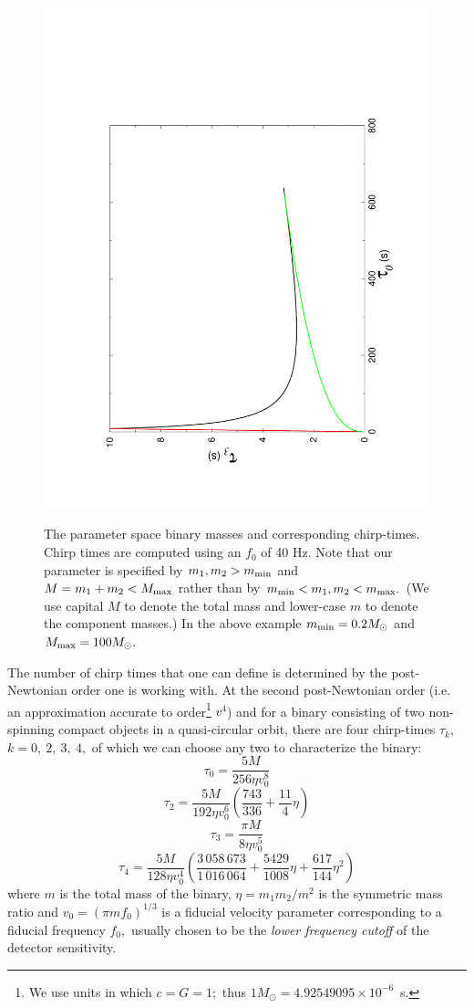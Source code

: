 \begin{figure}[h]
{\noindent\includegraphics[angle=-90,width=0.49\linewidth]{./LALInspiralBankHt0t3}
}
\caption{The parameter space binary masses and corresponding
chirp-times. Chirp times are computed using an $f_0$ of 40 Hz. Note
that our parameter is specified by $m_1, m_2 >m_{\rm min}$ and 
$M=m_1+m_2 < M_{\rm max}$ rather than by $m_{\rm min} < m_1,m_2 < m_{\rm max}.$
(We use capital $M$ to denote the total mass and lower-case $m$ to denote
the component masses.) In the above example $m_{\rm min} = 0.2 M_\odot$
and $M_{\rm max} = 100 M_\odot.$}
\label{fig:chirp-times}
\end{figure}

The number of chirp
times that one can define is determined by the post-Newtonian order
one is working with. At the second post-Newtonian order (i.e. 
an approximation accurate to order\footnote{We use units in 
which $c=G=1;$ thus $1M_\odot=4.92549095 \times 10^{-6}$~s.} $v^4$) and for
a binary consisting of two non-spinning compact objects in a quasi-circular
orbit, there are
four chirp-times $\tau_k,$ $k=0,\ 2,\ 3,\ 4,$ of which we can choose
any two to characterize the binary:
\begin{equation}
\tau_{0} = \frac{5M}{256 \eta v_{0}^{8}}
\end{equation}
\begin{equation}
\tau_{2} = \frac{5M}{192 \eta v_{0}^{6}} \left( \frac{743}{336} + \frac{11}{4} \eta \right)
\end{equation}
\begin{equation}
\tau_{3} = \frac{\pi M}{8 \eta v_{0}^{5}}
\end{equation}
\begin{equation}
\tau_{4} = \frac{5M}{128 \eta v_{0}^4} \left( \frac{3\,058\,673}{1\,016\,064} + \frac{5429}{1008}
\eta +
\frac{617}{144} \eta^{2} \right)
\end{equation}
where $m$ is the total mass of the
binary, $\eta=m_1m_2/m^2$ is the symmetric mass ratio and   
$v_0 = (\pi m f_0)^{1/3}$ is a fiducial velocity parameter corresponding
to a fiducial frequency $f_0,$ usually chosen to be the {\it lower 
frequency cutoff} of the detector sensitivity. 

